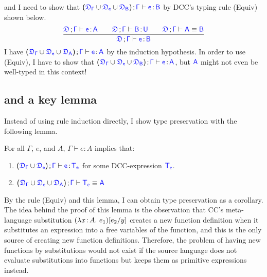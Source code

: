 and I need to show that 
$\sfpl \target{\fdef_{\Gamma}} \cup \target{\fdef_{e}} \cup \target{\fdef_{B}} \sfpr \semicolon \target{\Gamma} \vdash \target{e} \goodcolon \target{B}$
by DCC's typing rule (Equiv) shown below.
\begin{equation*}
	\frac
	{\target{\fdef}\semicolon \target{\Gamma} \vdash \itemtype{e}{A} \qquad
	 \target{\fdef}\semicolon \target{\Gamma} \vdash \itemtype{B}{U} \qquad
	 \target{\fdef}\semicolon \target{\Gamma} \vdash \target{A} \equiv \target{B}
	}
	{\target{\fdef}\semicolon \target{\Gamma} \vdash \itemtype{e}{B}}
\end{equation*}	
I have 
$\sfpl \target{\fdef_{\Gamma}} \cup \target{\fdef_{e}} \cup \target{\fdef_{A}} \sfpr \semicolon \target{\Gamma} \vdash \target{e} \goodcolon \target{A}$ by the induction hypothesis. 
In order to use (Equiv), I have to show that 
$\sfpl \target{\fdef_{\Gamma}} \cup \target{\fdef_{e}} \cup \target{\fdef_{B}} \sfpr \semicolon \target{\Gamma} \vdash \target{e} \goodcolon \target{A}$, but $\target{A}$ might not even be well-typed in this context!

\subsection{{\ccs} and a key lemma}

Instead of using rule induction directly, I show type preservation with the following lemma.
\begin{lemma} 
For all $\Gamma$, $e$, and $A$, $\Gamma \vdash e : A$ implies that:
\begin{enumerate}
	\item $\sfpl \target{\fdef_{\Gamma}} \cup \target{\fdef_{e}} \sfpr \semicolon \target{\Gamma} \vdash \target{e} \goodcolon \target{T_e}$ for some DCC-expression $\target{T_e}$.
	\item $\sfpl \target{\fdef_{\Gamma}} \cup \target{\fdef_{e}} \cup \target{\fdef_{A}} \sfpr \semicolon \target{\Gamma} \vdash \target{T_e} \equiv \target{A}$
\end{enumerate}
\label{lem: type preservation}
\end{lemma}
By the rule (Equiv) and this lemma, I can obtain type preservation as a corollary. The idea behind the proof of this lemma is the observation that CC's meta-language substitution $(\lambda x\hspace{0.5mm}{:}\hspace{0.5mm} A.\ e_1)[e_2\slash y]$ creates a new function definition when it substitutes an expression into a free variables of the function, and this is the only source of creating new function definitions. Therefore, the problem of having new functions by substitutions would not exist if the source language does not evaluate substitutions into functions but keeps them as primitive expressions instead.

